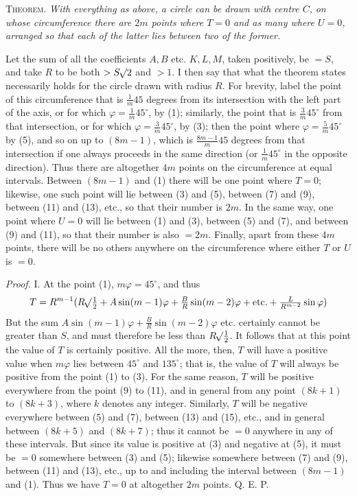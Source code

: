 \textsc{Theorem.} \textit{With everything as above, a circle can be drawn with centre $C$,}
\textit{on whose circumference there are $2m$ points where $T=0$ and as many where $U=0$, arranged so that each of the latter lies between two of the former.}

Let the sum of all the coefficients $A,B$ etc. $K,L,M$, taken positively, be \mbox{$=S$}, and take $R$ to be both $>S\mathord{{}^{}\!\surd}2$ and $>1$. I then say that what the theorem states necessarily holds for the circle drawn with radius $R$. For brevity, label the point of this circumference that is $\frac1m45$ degrees from its intersection with the left part of the axis, or for which $\varphi=\frac1m45^\circ$, by (1); similarly, the point that is $\frac3m45^\circ$ from that intersection, or for which $\varphi=\frac3m45^\circ$, by (3); then the point where $\varphi=\frac5m45^\circ$ by (5), and so on up to $(8m-1)$, which is $\frac{8m-1}m45$ degrees from that intersection if one always proceeds in the same direction (or $\frac1m45^\circ$ in the opposite direction). Thus there are altogether $4m$ points on the circumference at equal intervals. Between $(8m-1)$ and (1) there will be one point where $T=0$; likewise, one such point will lie between (3) and (5), between (7) and (9), between (11) and (13), etc., so that their number is $2m$. In the same way, one point where $U=0$ will lie between (1) and (3), between (5) and (7), and between (9) and (11), so that their number is also $=2m$. Finally, apart from these $4m$ points, there will be no others anywhere on the circumference where either $T$ or $U$ is $=0$.

\textit{Proof.} I. At the point (1), $m\varphi=45^\circ$, and thus
\[ T=R^{m-1}(R\mathord{{}^{}\!\surd}\tfrac12+A\sin(m-1)\varphi+\tfrac BR\sin(m-2)\varphi+\text{etc.}+\tfrac L{R^{m-2}}\sin\varphi)
\]
But the sum $A\sin(m-1)\varphi+\frac BR\sin(m-2)\varphi$ etc. certainly cannot be greater than $S$, and must therefore be less than $R\mathord{{}^{}\!\surd}\frac12$. It follows that at this point the value of $T$ is certainly positive. All the more, then, $T$ will have a positive value when $m\varphi$ lies between $45^\circ$ and $135^\circ$; that is, the value of $T$ will always be positive from the point (1) to (3). For the same reason, $T$ will be positive everywhere from the point (9) to (11), and in general from any point $(8k+1)$ to $(8k+3)$, where $k$ denotes any integer. Similarly, $T$ will be negative everywhere between (5) and (7), between (13) and (15), etc., and in general between $(8k+5)$ and $(8k+7)$; thus it cannot be $=0$ anywhere in any of these intervals. But since its value is positive at (3) and negative at (5), it must be $=0$ somewhere between (3) and (5); likewise somewhere between (7) and (9), between (11) and (13), etc.,
up to and including the interval between $(8m-1)$ and (1). Thus we have $T=0$ at altogether $2m$ points. Q. E. P.


